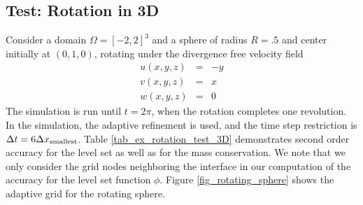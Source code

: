 \documentclass[english]{article}
\begin{document}

\subsection{Test: Rotation in 3D \label{ex_rotation_test_3D}}

Consider a domain $\Omega=[-2, 2]^3$ and a sphere of radius $R=.5$ and
center initially at $(0,1,0)$, rotating under the divergence free velocity
field
$$
\begin{array}{lcr}
u(x,y,z) &=& -y \\
v(x,y,z) &=& x  \\
w(x,y,z) &=& 0
\end{array}
$$
The simulation is run until $t=2\pi$, when the rotation completes one
revolution. In the simulation, the adaptive refinement is used, and the
time step restriction is $\Delta t=6\Delta x_{\rm smallest}$. Table
\ref{tab_ex_rotation_test_3D} demonstrates second order accuracy for the
level set as well as for the mass conservation.  We note that we only
consider the grid nodes neighboring the interface in our computation of the
accuracy for the level set function $\phi$. Figure
\ref{fig_rotating_sphere} shows the adaptive grid for the rotating sphere.
\end{document}
